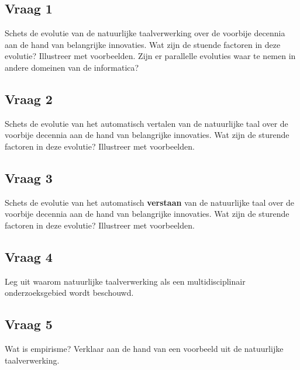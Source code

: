 \documentclass[../main.tex]{subfiles}
\begin{document}
\subsection{Vraag 1}
\begin{question}
Schets de evolutie van de natuurlijke taalverwerking over de voorbije decennia aan de hand van belangrijke innovaties. Wat zijn de stuende factoren in deze evolutie? Illustreer met voorbeelden.
Zijn er parallelle evoluties waar te nemen in andere domeinen van de informatica?
\end{question}

\begin{solution}

\subsection{Vraag 2}
\begin{question}
Schets de evolutie van het automatisch vertalen van de natuurlijke taal over de voorbije decennia aan de hand van belangrijke innovaties. Wat zijn de sturende factoren in deze evolutie? Illustreer met voorbeelden.
\end{question}

\begin{solution}

\subsection{Vraag 3}
\begin{question}
Schets de evolutie van het automatisch \textbf{verstaan} van de natuurlijke taal over de voorbije decennia aan de hand van belangrijke innovaties. Wat zijn de sturende factoren in deze evolutie? Illustreer met voorbeelden.
\end{question}

\begin{solution}

\subsection{Vraag 4}
\begin{question}
Leg uit waarom natuurlijke taalverwerking als een multidisciplinair onderzoeksgebied wordt beschouwd.
\end{question}

\begin{solution}

\subsection{Vraag 5}
\begin{question}
Wat is empirisme? Verklaar aan de hand van een voorbeeld uit de natuurlijke taalverwerking.
\end{question}


\end{solution}
\end{solution}
\end{solution}
\end{solution}
\end{document}
